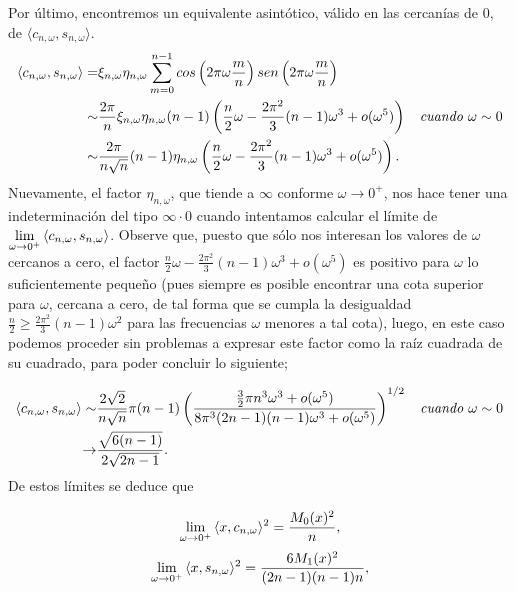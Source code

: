 Por último, encontremos un equivalente
asintótico, válido en las cercanías de $0$, de 
$\langle
c_{n, \omega}, s_{n, \omega}
\rangle $.
\begin{align*}
\langle
c_{n, \omega}, s_{n, \omega}
\rangle = &
\xi_{n, \omega} \eta_{n, \omega}
\sum\limits_{m=0}^{n-1}
cos\left(
2 \pi \omega\frac{m}{n}
\right)
sen\left(
2 \pi \omega\frac{m}{n}
\right)
 \\
\sim &
\frac{2\pi}{n}
\xi_{n, \omega} \eta_{n, \omega}
(n-1)  
\left(
\frac{n}{2} \omega - \frac{2\pi^{2}}{3} (n-1) \omega^{3} + o(\omega^{5})
\right) 
\hspace{0.2cm} \textit{ cuando } \omega \sim 0
\\
\sim &
\frac{2\pi}{n \sqrt{n}}
(n-1) 
\eta_{n, \omega} 
\left(
\frac{n}{2} \omega - \frac{2\pi^{2}}{3} (n-1) \omega^{3} + o(\omega^{5})
\right). \\
\end{align*}
Nuevamente, el factor 
$\eta_{n, \omega}$, que tiende a $\infty$
conforme $\omega \rightarrow 0^{+}$,
nos hace tener una indeterminación
del tipo $\infty \cdot 0$
cuando intentamos calcular el límite
de 
$
\lim\limits_{\omega \rightarrow 0^{+}}{
\langle
c_{n, \omega}, s_{n, \omega}
\rangle}
$.
Observe que, puesto que sólo nos interesan los valores
de $\omega$ cercanos a cero, el factor 
$
\frac{n}{2} \omega - \frac{2\pi^{2}}{3} (n-1) \omega^{3} + o(\omega^{5})
$
es positivo 
para $\omega$ lo suficientemente pequeño
(pues siempre es posible encontrar una cota
superior para $\omega$, cercana a cero, de tal forma que se 
cumpla la desigualdad $\frac{n}{2} \geq \frac{2 \pi^{2}}{3}(n-1)
\omega^{2}$ para las frecuencias $\omega$ menores a tal cota), luego, 
en este caso podemos proceder sin problemas a expresar este
factor
como la raíz cuadrada de su cuadrado, para poder concluir lo siguiente; 


\begin{align*}
\langle
c_{n, \omega}, s_{n, \omega}
\rangle \sim & 
\frac{2 \sqrt{2}}{n \sqrt{n}} \pi (n-1)
\left(
\frac{
\frac{3}{2} \pi n^{3}\omega^{3} + o(\omega^{5})
}{
8 \pi^{3}(2n-1)(n-1)\omega^{3} + o(\omega^{5})
}
\right)^{1/2} 
\hspace{0.2cm} \textit{ cuando } \omega \sim 0
\\
\rightarrow & \frac{
\sqrt{6(n-1)}
}{2 \sqrt{2n-1}}.
\end{align*} 
De estos límites se deduce que 

\begin{equation}
\label{ec: limite x, cnw cuadr}
\lim\limits_{\omega \rightarrow 0^{+}}{\langle
x, c_{n, \omega}
\rangle^{2} }
= \frac{M_{0}(x)^{2}}{n},
\end{equation}
\begin{equation}
\label{ec: limite x, snw cuad}
\lim\limits_{\omega \rightarrow 0^{+}}{\langle
x, s_{n, \omega}
\rangle^{2} }
= \frac{6M_{1}(x)^{2}}{(2n-1)(n-1)n},
\end{equation}

